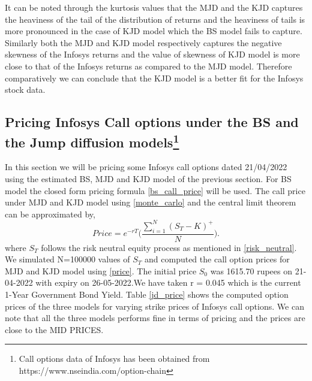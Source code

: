 \documentclass[12pt]{report}
\begin{document}
It can be noted through the kurtosis values that the MJD and the KJD captures the heaviness of the tail of the distribution of returns and the heaviness of tails is more pronounced in the case of KJD model which the BS model fails to capture. Similarly both the MJD and KJD model respectively captures the negative skewness of the Infosys returns and the value of skewness of KJD model is more close to that of the Infosys returns as compared to the MJD model. Therefore comparatively we can conclude that the KJD model is a better fit for the Infosys stock data.  

\subsection{Pricing Infosys Call options under the BS and the Jump diffusion models\footnote{Call options data of Infosys has been obtained from https://www.nseindia.com/option-chain}}
In this section we will be pricing some Infosys call options dated 21/04/2022 using the estimated BS, MJD and KJD model of the previous section. For BS model the closed form pricing formula \ref{bs_call_price} will be used. The call price under MJD and KJD model using \ref{monte_carlo} and the central limit theorem can be approximated by,
\begin{equation}
    Price = e^{-rT} \Big(\frac{\sum_{i=1}^N (S_T - K)^{+}}{N}\Big).
\label{price}    
\end{equation}
where $S_T$ follows the risk neutral equity process as mentioned in \ref{risk_neutral}. We simulated N=100000 values of $S_T$ and computed the call option prices for MJD and KJD model using \ref{price}. The initial price $S_0$ was 1615.70 rupees on 21-04-2022 with expiry on 26-05-2022.We have taken r = 0.045 which is the current 1-Year Government Bond Yield.
Table \ref{jd_price} shows the computed option prices of the three models for varying strike prices of Infosys call options. We can note that all the three models performs fine in terms of pricing and the prices are close to the MID PRICES. 
\end{document}
